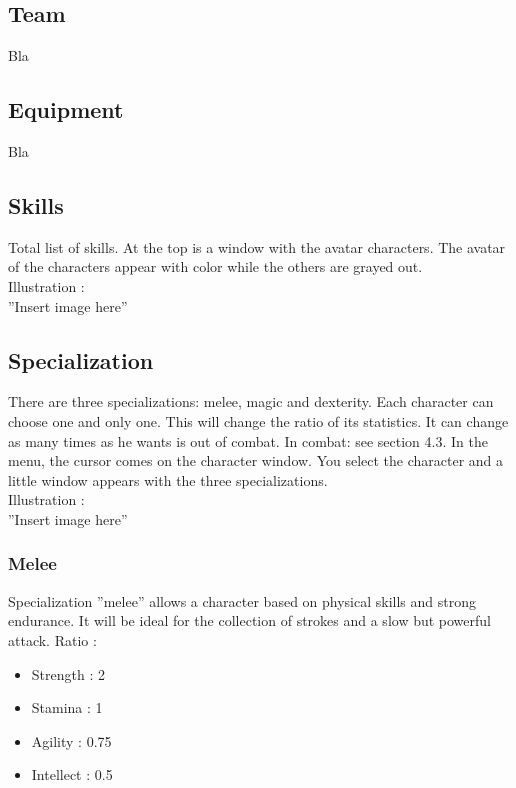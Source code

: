 \documentclass[a4paper,12pt]{book}
\begin{document}
\subsection{Team}
Bla
\subsection{Equipment}
Bla
\subsection{Skills}
Total list of skills. At the top is a window with the avatar characters. The avatar of the characters appear with color while the others are grayed out. \\ Illustration : \\ ''Insert image here''
\subsection{Specialization}
There are three specializations: melee, magic and dexterity. Each character can choose one and only one. This will change the ratio of its statistics. It can change as many times as he wants is out of combat. In combat: see section 4.3.
In the menu, the cursor comes on the character window. You select the character and a little window appears with the three specializations. \\ Illustration : \\ ''Insert image here''
\subsubsection{Melee}
Specialization ''melee'' allows a character based on physical skills and strong endurance. It will be ideal for the collection of strokes and a slow but powerful attack. \newpage
Ratio :
\begin{itemize}
\item Strength : 2
\item Stamina : 1
\item Agility : 0.75
\item Intellect : 0.5
\end{itemize}
\end{document}
